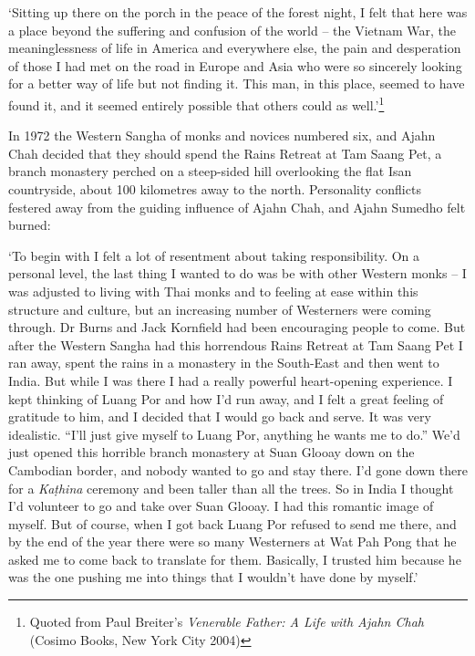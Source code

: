 `Sitting up there on the porch in the peace of the forest night, I felt
that here was a place beyond the suffering and confusion of the world
-- the Vietnam War, the meaninglessness of life in America and
everywhere else, the pain and desperation of those I had met on the road
in Europe and Asia who were so sincerely looking for a better way of
life but not finding it. This man, in this place, seemed to have found
it, and it seemed entirely possible that others could as
well.'\footnote{Quoted from Paul Breiter's \emph{Venerable Father: A
  Life with Ajahn Chah} (Cosimo Books, New York City 2004)}

In 1972 the Western Sangha of monks and novices numbered six, and Ajahn
Chah decided that they should spend the Rains Retreat at Tam Saang Pet, 
a branch monastery perched on a steep-sided hill overlooking the flat
Isan countryside, about 100 kilometres away to the north. Personality
conflicts festered away from the guiding influence of Ajahn Chah, and
Ajahn Sumedho felt burned: 

`To begin with I felt a lot of resentment about taking responsibility. 
On a personal level, the last thing I wanted to do was be with other
Western monks -- I was adjusted to living with Thai monks and to
feeling at ease within this structure and culture, but an increasing
number of Westerners were coming through. Dr Burns and Jack Kornfield
had been encouraging people to come. But after the Western Sangha had
this horrendous Rains Retreat at Tam Saang Pet I ran away, spent the
rains in a monastery in the South-East and then went to India. But while
I was there I had a really powerful heart-opening experience. I kept
thinking of Luang Por and how I'd run away, and I felt a great feeling
of gratitude to him, and I decided that I would go back and serve. It
was very idealistic. ``I'll just give myself to Luang Por, anything he
wants me to do.'' We'd just opened this horrible branch monastery at
Suan Glooay down on the Cambodian border, and nobody wanted to go and
stay there. I'd gone down there for a \emph{Kaṭhina} ceremony and been
taller than all the trees. So in India I thought I'd volunteer to go and
take over Suan Glooay. I had this romantic image of myself. But of
course, when I got back Luang Por refused to send me there, and by the
end of the year there were so many Westerners at Wat Pah Pong that he
asked me to come back to translate for them. Basically, I trusted him
because he was the one pushing me into things that I wouldn't have done
by myself.'

\dividerRule


